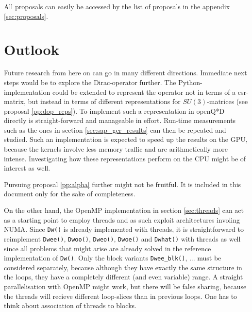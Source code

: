 \documentclass{article}
\theoremstyle{plain} %
\theoremstyle{convention} %
\theoremstyle{remark} %
\def\code#1{\texttt{#1}}
\numberwithin{equation}{section}
\begin{document}
All proposals can easily be accessed by the list of proposals in the appendix \ref{sec:proposals}.

\newpage

\section{Outlook}

\label{sec:outlook}

Future research from here on can go in many different directions. Immediate next steps would be to explore the Dirac-operator further. The Python-implementation could be extended to represent the operator not in terms of a \acrshort{csr}-matrix, but instead in terms of different representations for $SU(3)$-matrices (see proposal \ref{pp:dop_reps}). To implement such a representation in openQ*D directly is straight-forward and manageable in effort. Run-time measurements such as the ones in section \ref{sec:sap_gcr_results} can then be repeated and studied. Such an implementation is expected to speed up the results on the GPU, because the kernels involve less memory traffic and are arithmetically more intense. Investigating how these representations perform on the CPU might be of interest as well.

Pursuing proposal \ref{pp:alpha} further might not be fruitful. It is included in this document only for the sake of completeness.

On the other hand, the OpenMP implementation in section \ref{sec:threads} can act as a starting point to employ threads and as such exploit architectures involing NUMA. Since \code{Dw()} is already implemented with threads, it is straightforward to reimplement \code{Dwee()}, \code{Dwoo()}, \code{Dweo()}, \code{Dwoe()} and \code{Dwhat()} with threads as well since all problems that might arise are already solved in the reference implementation of \code{Dw()}. Only the block variants \code{Dwee\_blk()}, ... must be considered separately, because although they have exactly the same structure in the loops, they have a completely different (and even variable) range. A straight parallelisation with OpenMP might work, but there will be false sharing, because the threads will recieve different loop-slices than in previous loops. One has to think about association of threads to blocks.
\end{document}
